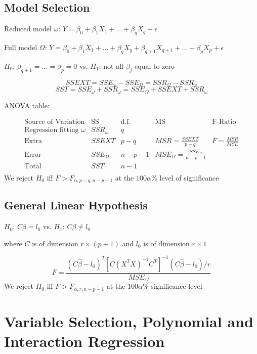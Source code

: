 \documentclass[11pt,a4paper]{article}
\begin{document}
\subsection{Model Selection}
Reduced model $\omega$: $Y = \beta_0 + \beta_1 X_1 + \dots + \beta_q X_q + \epsilon$ \par
Full model $\Omega$: $Y = \beta_0 + \beta_1 X_1 + \dots + \beta_q X_q + \beta_{q+1} X_{q+1} + \dots + \beta_p X_p + \epsilon$ \par
$H_0$: $\beta_{q+1} = \dots = \beta_p = 0$ vs. $H_1$: not all $\beta_j$ equal to zero \par

\[
SSEXT = SSE_{\omega} - SSE_{\Omega} = SSR_{\Omega} - SSR_{\omega}
\]
\[
SST = SSE_{\omega} + SSR_{\omega} = SSE_{\Omega} + SSEXT + SSR_{\omega}
\]

ANOVA table: \par
\[
\begin{array}{lcccc}
    \hline\hline
    \text{Source of Variation} & \text{SS} & \text{d.f.} & \text{MS} & \text{F-Ratio} \\
    \hline
    \text{Regression fitting } \omega & SSR_{\omega} & q & & \\
    \text{Extra} & SSEXT & p-q & MSR = \frac{SSEXT}{p-q} & F = \frac{MSR}{MSE} \\
    \text{Error} & SSE_{\Omega} & n-p-1 & MSE_{\Omega} = \frac{SSE_{\Omega}}{n-p-1} & \\
    \hline
    \text{Total} & SST & n-1 & & \\
\end{array}
\]
We reject $H_0$ iff $F > F_{\alpha, p-q, n-p-1}$ at the $100\alpha\%$ level of significance \par

\subsection{General Linear Hypothesis}
$H_0$: $C\beta = l_0$ vs. $H_1$: $C\beta \neq l_0$ \par
where $C$ is of dimension $r \times (p+1)$ and $l_0$ is of dimension $r \times 1$ \par
\[
F = \frac{(C\hat{\beta} - l_0)^T \left[C(X^TX)^{-1} C^T\right]^{-1} (C\hat{\beta} - l_0)/r}{MSE_\Omega}
\]
We reject $H_0$ iff $F > F_{\alpha, r, n-p-1}$ at the $100\alpha\%$ significance level \par

\section{Variable Selection, Polynomial and Interaction Regression}
\end{document}
